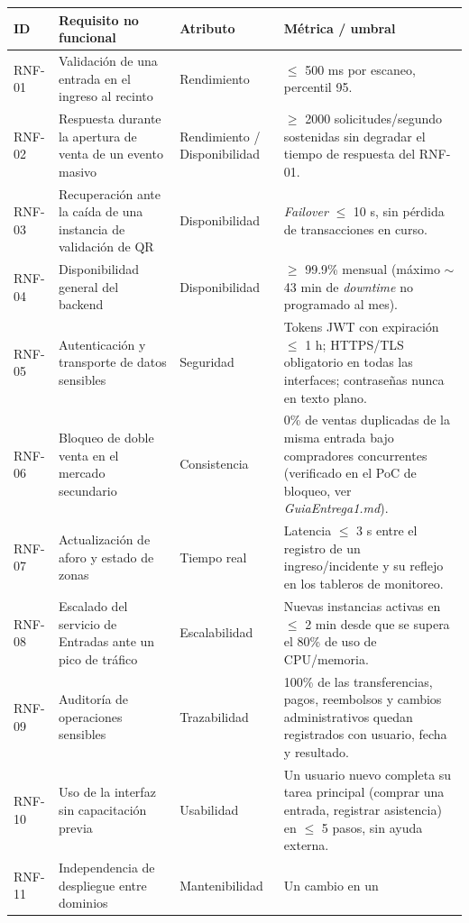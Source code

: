 \documentclass[11pt,a4paper]{article}
\begin{document}
\begin{center}
\begin{longtable}{|p{1.3cm}|p{4.6cm}|p{2.4cm}|p{5.3cm}|}
\hline
\textbf{ID} & \textbf{Requisito no funcional} & \textbf{Atributo} & \textbf{Métrica / umbral}\\
\hline
\endhead
RNF-01 & Validación de una entrada en el ingreso al recinto & Rendimiento & $\leq$ 500 ms por
escaneo, percentil 95.\\
\hline
RNF-02 & Respuesta durante la apertura de venta de un evento masivo & Rendimiento /
Disponibilidad & $\geq$ 2000 solicitudes/segundo sostenidas sin degradar el tiempo de respuesta
del RNF-01.\\
\hline
RNF-03 & Recuperación ante la caída de una instancia de validación de QR & Disponibilidad &
\textit{Failover} $\leq$ 10 s, sin pérdida de transacciones en curso.\\
\hline
RNF-04 & Disponibilidad general del backend & Disponibilidad & $\geq$ 99.9\% mensual (m\'aximo
$\sim$43 min de \textit{downtime} no programado al mes).\\
\hline
RNF-05 & Autenticación y transporte de datos sensibles & Seguridad & Tokens JWT con expiración
$\leq$ 1 h; HTTPS/TLS obligatorio en todas las interfaces; contraseñas nunca en texto plano.\\
\hline
RNF-06 & Bloqueo de doble venta en el mercado secundario & Consistencia & 0\% de ventas
duplicadas de la misma entrada bajo compradores concurrentes (verificado en el PoC de bloqueo,
ver \textit{GuiaEntrega1.md}).\\
\hline
RNF-07 & Actualización de aforo y estado de zonas & Tiempo real & Latencia $\leq$ 3 s entre el
registro de un ingreso/incidente y su reflejo en los tableros de monitoreo.\\
\hline
RNF-08 & Escalado del servicio de Entradas ante un pico de tráfico & Escalabilidad & Nuevas
instancias activas en $\leq$ 2 min desde que se supera el 80\% de uso de CPU/memoria.\\
\hline
RNF-09 & Auditoría de operaciones sensibles & Trazabilidad & 100\% de las transferencias, pagos,
reembolsos y cambios administrativos quedan registrados con usuario, fecha y resultado.\\
\hline
RNF-10 & Uso de la interfaz sin capacitación previa & Usabilidad & Un usuario nuevo completa su
tarea principal (comprar una entrada, registrar asistencia) en $\leq$ 5 pasos, sin ayuda externa.\\
\hline
RNF-11 & Independencia de despliegue entre dominios & Mantenibilidad & Un cambio en un

\end{longtable}
\end{center}
\end{document}
